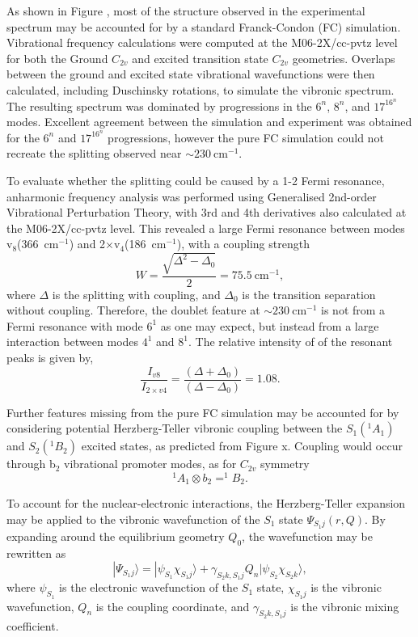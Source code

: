 \documentclass[journal=jpcafh,manuscript=article,layout=onecolumn, 12pt]{achemso}
\begin{document}
As shown in Figure , most of the structure observed in the experimental spectrum may be accounted for by a standard Franck-Condon (FC) simulation. Vibrational frequency calculations were computed at the M06-2X/cc-pvtz level for both the Ground $C_{2v}$ and excited transition state $C_{2v}$ geometries. Overlaps between the ground and excited state vibrational wavefunctions were then calculated, including Duschinsky rotations, to simulate the vibronic spectrum. The resulting spectrum was dominated by progressions in the $6^n$, $8^n$, and $17^16^n$ modes. Excellent agreement between the simulation and experiment was obtained for the $6^n$ and $17^16^n$ progressions, however the pure FC simulation could not recreate the splitting observed near $\sim230~$cm$^{-1}$. 

To evaluate whether the splitting could be caused by a 1-2 Fermi resonance, anharmonic frequency analysis was performed using Generalised 2nd-order Vibrational Perturbation Theory, with 3rd and 4th derivatives also calculated at the M06-2X/cc-pvtz level. This revealed a large Fermi resonance between modes v$_8$(366~cm$^{-1}$) and 2$\times$v$_4$(186~cm$^{-1}$), with a coupling strength
\begin{equation}
W = \frac{\sqrt{\Delta^2-\Delta_0}}{2} =75.5~\text{cm}^{-1},
\end{equation} 
where $\Delta$ is the splitting with coupling, and $\Delta_0$ is the transition separation without coupling. Therefore, the doublet feature at $\sim230~$cm$^{-1}$ is not from a Fermi resonance with mode $6^1$ as one may expect, but instead from a large interaction between modes $4^1$ and $8^1$. The relative intensity of of the resonant peaks is given by,
\begin{equation}
\frac{I_{v8}}{I_{2\times v4}} = \frac{\left(\Delta+\Delta_0\right)}{\left(\Delta-\Delta_0\right)}=1.08.
\end{equation}

Further features missing from the pure FC simulation may be accounted for by considering potential Herzberg-Teller vibronic coupling between the $S_1(^1A_1)$ and $S_2(^1B_2)$ excited states, as predicted from Figure x. Coupling would occur through b$_2$ vibrational promoter modes, as for $C_{2v}$ symmetry 
\begin{equation}
^1A_1 \otimes b_2 = ^1B_2.
\end{equation}

To account for the nuclear-electronic interactions, the Herzberg-Teller expansion may be applied to the vibronic wavefunction of the $S_1$ state $\Psi_{S_1j}(r,Q)$. By expanding around the equilibrium geometry $Q_0$, the wavefunction may be rewritten as 
\begin{equation}
|\Psi_{S_1j} \rangle = |\psi_{S_1} \chi_{S_1j} \rangle + \gamma_{S_2k,S_1j}Q_n|\psi_{S_2} \chi_{S_2k}\rangle, 
\label{eq:shorthand}
\end{equation}
where $\psi_{S_1}$ is the electronic wavefunction of the $S_1$ state, $\chi_{S_1j}$ is the vibronic wavefunction, $Q_n$ is the coupling coordinate, and $\gamma_{S_2k,S_1j}$ is the vibronic mixing coefficient.
\end{document}
